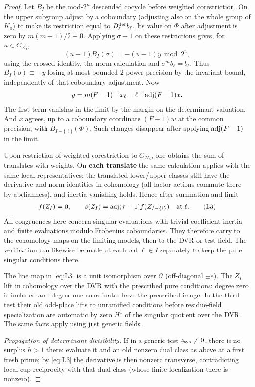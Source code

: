 \begin{proof}
Let \(B_I\) be the mod-\(2^n\) descended cocycle before weighted corestriction. On the upper subgroup adjust by a coboundary (adjusting also on the whole group of \(K_0\)) to make its restriction equal to \(D_\ell^{\rm der}b_\ell\). Its value on \(\Phi\) after adjustment is zero by \(m(m-1)/2\equiv0\). Applying \(\sigma-1\) on these restrictions gives, for \(u\in G_{K_I}\),
\[
                 (u-1)B_I(\sigma)=-(u-1)y\bmod 2^n,
\]
using the crossed identity, the norm calculation and \(\sigma^m b_\ell=b_\ell\). Thus \(B_I(\sigma)\equiv-y\) losing at most bounded \(2\)-power precision by the invariant bound, independently of that coboundary adjustment. Now
\[
             y=m(F-1)^{-1}x_\ell-\ell^{-1}{\rm adj}(F-1)x .
\]
The first term vanishes in the limit by the margin on the determinant valuation. And \(x\) agrees, up to a coboundary coordinate \((F-1)w\) at the common precision, with \(B_{I-\{\ell\}}(\Phi)\). Such changes disappear after applying \({\rm adj}(F-1)\) in the limit.

Upon restriction of weighted corestriction to \(G_{K_0}\), one obtains the sum of translates with weights. On \textbf{each translate} the same calculation applies with the same local representatives: the translated lower/upper classes still have the derivative and norm identities in cohomology (all factor actions commute there by abelianness), and inertia vanishing holds. Hence after summation and limit
\[
         f(Z_I)=0,\qquad s(Z_I)={\rm adj}(\tau-1) f(Z_{I-\{\ell\}})
                                    \quad\text{at }\ell .           \tag{L3}\label{eq:L3}
\]
All congruences here concern singular evaluations with trivial coefficient inertia and finite evaluations modulo Frobenius coboundaries. They therefore carry to the cohomology maps on the limiting models, then to the DVR or test field. The verification can likewise be made at each old \(\ell\in I\) separately to keep the pure singular conditions there. 

The line map in \eqref{eq:L3} is a unit isomorphism over \(\mathscr O\) (off-diagonal \(\pm e\)). The \(Z_I\) lift in cohomology over the DVR with the prescribed pure conditions: degree zero is included and degree-one coordinates have the prescribed image. In the third test their old odd-place lifts to unramified conditions before residue-field specialization are automatic by zero \(H^1\) of the singular quotient over the DVR. The same facts apply using just generic fields.

\emph{Propagation of determinant divisibility.}
If in a generic test \(z_{\rm sys}\ne0\), there is no surplus \(h>1\) there: evaluate it and an old nonzero dual class as above at a first fresh prime; by \eqref{eq:L3} the derivative is then nonzero transverse, contradicting local cup reciprocity with that dual class (whose finite localization there is nonzero). 


\end{proof}
